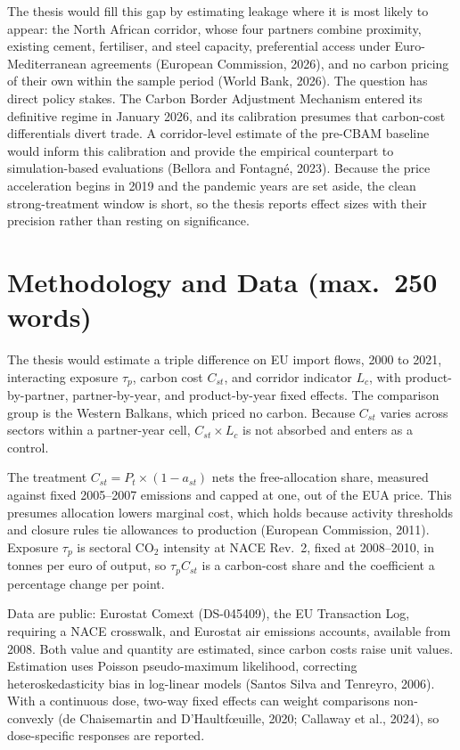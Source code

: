 \documentclass[12pt,a4paper]{article}
\begin{document}
The thesis would fill this gap by estimating leakage where it is most likely to appear: the North African corridor, whose four partners combine proximity, existing cement, fertiliser, and steel capacity, preferential access under Euro-Mediterranean agreements (European Commission, 2026), and no carbon pricing of their own within the sample period (World Bank, 2026). The question has direct policy stakes. The Carbon Border Adjustment Mechanism entered its definitive regime in January 2026, and its calibration presumes that carbon-cost differentials divert trade. A corridor-level estimate of the pre-CBAM baseline would inform this calibration and provide the empirical counterpart to simulation-based evaluations (Bellora and Fontagn\'{e}, 2023). Because the price acceleration begins in 2019 and the pandemic years are set aside, the clean strong-treatment window is short, so the thesis reports effect sizes with their precision rather than resting on significance.

\section{Methodology and Data (max.\ 250 words)}

The thesis would estimate a triple difference on EU import flows, 2000 to 2021, interacting exposure $\tau_p$, carbon cost $C_{st}$, and corridor indicator $L_c$, with product-by-partner, partner-by-year, and product-by-year fixed effects. The comparison group is the Western Balkans, which priced no carbon. Because $C_{st}$ varies across sectors within a partner-year cell, $C_{st} \times L_c$ is not absorbed and enters as a control.

The treatment $C_{st} = P_t \times (1 - a_{st})$ nets the free-allocation share, measured against fixed 2005--2007 emissions and capped at one, out of the EUA price. This presumes allocation lowers marginal cost, which holds because activity thresholds and closure rules tie allowances to production (European Commission, 2011). Exposure $\tau_p$ is sectoral CO$_2$ intensity at NACE Rev.~2, fixed at 2008--2010, in tonnes per euro of output, so $\tau_p C_{st}$ is a carbon-cost share and the coefficient a percentage change per point.

Data are public: Eurostat Comext (DS-045409), the EU Transaction Log, requiring a NACE crosswalk, and Eurostat air emissions accounts, available from 2008. Both value and quantity are estimated, since carbon costs raise unit values. Estimation uses Poisson pseudo-maximum likelihood, correcting heteroskedasticity bias in log-linear models (Santos Silva and Tenreyro, 2006). With a continuous dose, two-way fixed effects can weight comparisons non-convexly (de Chaisemartin and D'Haultf\oe uille, 2020; Callaway et al., 2024), so dose-specific responses are reported.
\end{document}
